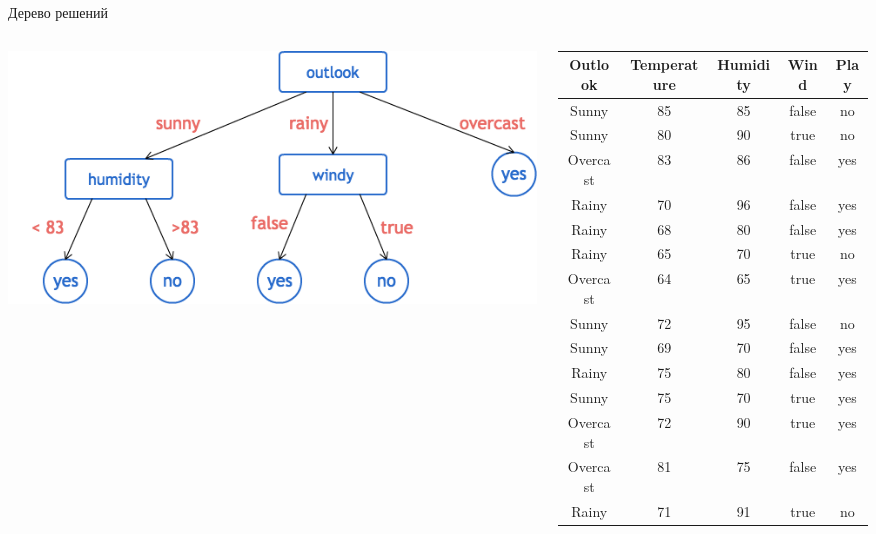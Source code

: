 \documentclass[aspectratio=169]{beamer}
\begin{document}
\begin{frame}{Дерево решений}
    
\begin{columns}
\begin{column}{.5\textwidth}
\begin{center}
\includegraphics[width=\textwidth]{images/dtree.png}
\end{center}
\end{column}
%   
\begin{column}{.5\textwidth}
\begin{tiny}
\begin{center}
\begin{tabular}{c | c | c | c | c }
\bf Outlook & \bf Temperature & \bf Humidity & \bf Wind & \bf Play \\
\hline
Sunny & 85 & 85 & false & no \\
Sunny & 80 & 90 & true & no \\
Overcast & 83 & 86 & false & yes \\
Rainy & 70 & 96 & false & yes \\
Rainy & 68 & 80 & false & yes \\
Rainy & 65 & 70 & true & no \\
Overcast & 64 & 65 & true & yes \\
Sunny & 72 & 95 & false & no \\
Sunny & 69 & 70 & false & yes \\
Rainy & 75 & 80 & false & yes \\
Sunny & 75 & 70 & true & yes \\
Overcast & 72 & 90 & true & yes \\
Overcast & 81 & 75 & false & yes \\
Rainy & 71 & 91 & true & no \\
\end{tabular}
\end{center}
\end{tiny}
\end{column}
\end{columns}

\end{frame}
\end{document}
